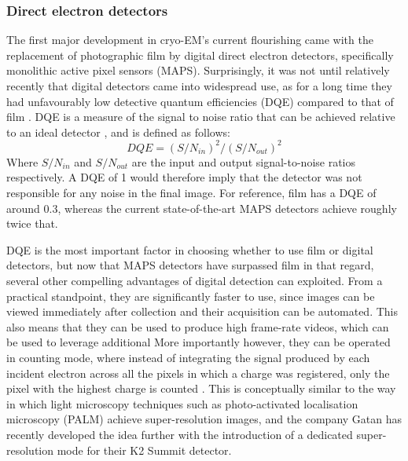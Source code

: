 \documentclass[a4paper,11pt,twoside,openright]{scrbook}
\begin{document}
\subsubsection{Direct electron detectors}
The first major development in cryo-EM's current flourishing came with the replacement of photographic film by digital direct electron detectors, specifically monolithic active pixel sensors (MAPS). Surprisingly, it was not until relatively recently that digital detectors came into widespread use, as for a long time they had unfavourably low detective quantum efficiencies (DQE) compared to that of film \cite{McMullan2009}. DQE is a measure of the signal to noise ratio that can be achieved relative to an ideal detector \cite{Dainty1975}, and is defined as follows:
\begin{displaymath}
    DQE = (S/N_{in})^{2}/(S/N_{out})^{2}
\end{displaymath}
Where \begin{math} S/N_{in} \end{math} and \begin{math} S/N_{out} \end{math} are the input and output signal-to-noise ratios respectively. A DQE of 1 would therefore imply that the detector was not responsible for any noise in the final image. For reference, film has a DQE of around 0.3, whereas the current state-of-the-art MAPS detectors achieve roughly twice that.

DQE is the most important factor in choosing whether to use film or digital detectors, but now that MAPS detectors have surpassed film in that regard, several other compelling advantages of digital detection can exploited. From a practical standpoint, they are significantly faster to use, since images can be viewed immediately after collection and their acquisition can be automated. This also means that they can be used to produce high frame-rate videos, which can be used to leverage additional  More importantly however, they can be operated in counting mode, where instead of integrating the signal produced by each incident electron across all the pixels in which a charge was registered, only the pixel with the highest charge is counted \cite{McMullan2009a}. This is conceptually similar to the way in which light microscopy techniques such as photo-activated localisation microscopy (PALM) \cite{Betzig2006} achieve super-resolution images, and the company Gatan has recently developed the idea further with the introduction of a dedicated super-resolution mode for their K2 Summit detector.
\end{document}

